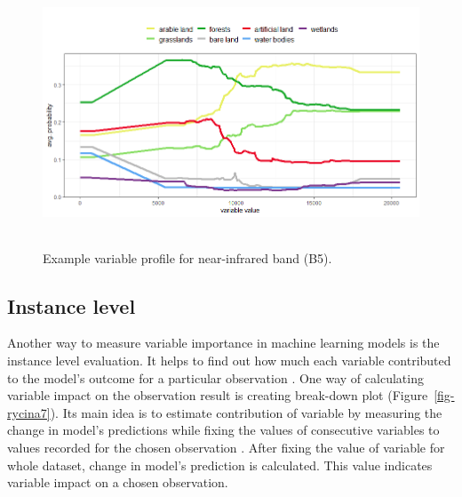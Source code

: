 \documentclass{amuthesis}
\begin{document}
\begin{figure}[H]

{\centering \includegraphics[width=5.625in,height=3.125in]{./figures/profB5.png}

}

\caption{\label{fig-rycina6}Example variable profile for near-infrared
band (B5).}

\end{figure}

\hypertarget{sec-importance-instance}{%
\subsection{Instance level}\label{sec-importance-instance}}

Another way to measure variable importance in machine learning models is
the instance level evaluation. It helps to find out how much each
variable contributed to the model's outcome for a particular observation
\autocite{biecek_explanatory_2021}. One way of calculating variable
impact on the observation result is creating break-down plot
(Figure~\ref{fig-rycina7}). Its main idea is to estimate contribution of
variable by measuring the change in model's predictions while fixing the
values of consecutive variables to values recorded for the chosen
observation \autocite{biecek_explanatory_2021}. After fixing the value
of variable for whole dataset, change in model's prediction is
calculated. This value indicates variable impact on a chosen
observation.
\end{document}
